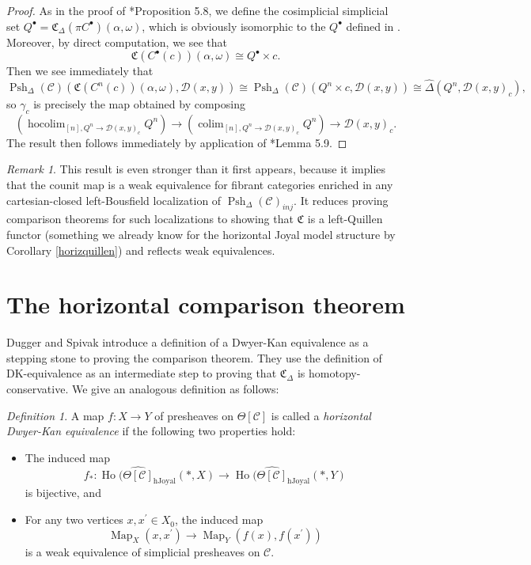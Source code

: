 \documentclass{amsart}
\numberwithin{equation}{section}
\theoremstyle{plain}   %
\theoremstyle{remark}
\newtheorem{rem}[subsection]{Remark}
\newtheorem{defn}[subsection]{Definition}
\theoremstyle{plain}
\DeclareMathOperator*{\coliml}{colim}
\DeclareMathOperator{\Map}{Map}
\DeclareMathOperator*{\hocoliml}{hocolim}
\newcommand{\psh}[1]{\ensuremath{\widehat{#1}}}
\newcommand{\C}{\ensuremath{\mathcal{C}}}
\newcommand{\cellset}{\ensuremath{\widehat{\Theta[\mathcal{C}]}}}
\newcommand{\spsh}{\ensuremath{\operatorname{Psh}_\Delta(\mathcal{C})}}
\begin{document}
\begin{proof}
	As in the proof of \cite{ds2}*{Proposition 5.8}, we define the cosimplicial simplicial set \(Q^\bullet = \mathfrak{C}_\Delta (\pi C^\bullet)(\alpha,\omega)\), which is obviously isomorphic to the \(Q^\bullet\) defined in \cite{ds2}. Moreover, by direct computation, we see that
	\[\mathfrak{C}(C^\bullet(c))(\alpha,\omega)\cong Q^\bullet \times c.\]
	Then we see immediately that
	\[\spsh(\mathfrak{C}(C^n(c))(\alpha,\omega), \mathcal{D}(x,y)) \cong \spsh(Q^n \times c, \mathcal{D}(x,y))\cong \psh{\Delta}(Q^n, \mathcal{D}(x,y)_c),\]
	so \(\gamma_c\) is precisely the map obtained by composing
	\[\left(\hocoliml_{[n],Q^n\to \mathcal{D}(x,y)_c} Q^n\right) \to \left(\coliml_{[n],Q^n\to \mathcal{D}(x,y)_c} Q^n\right) \to \mathcal{D}(x,y)_c.\]
	The result then follows immediately by application of \cite{ds2}*{Lemma 5.9}.
\end{proof}

\begin{rem}
	This result is even stronger than it first appears, because it implies that the counit map is a weak equivalence for fibrant categories enriched in any cartesian-closed left-Bousfield localization of \(\spsh_{inj}\).  It reduces proving comparison theorems for such localizations to showing that \(\mathfrak{C}\) is a left-Quillen functor (something we already know for the horizontal Joyal model structure by Corollary \ref{horizquillen}) and reflects weak equivalences.
\end{rem}

\section{The horizontal comparison theorem}\label{horizcomparison}
Dugger and Spivak introduce a definition of a Dwyer-Kan equivalence as a stepping stone to proving the comparison theorem.  They use the definition of DK-equivalence as an intermediate step to proving that \(\mathfrak{C}_\Delta\) is homotopy-conservative.  We give an analogous definition as follows:

\begin{defn}
  A map \(f:X\to Y\) of presheaves on \(\Theta[\C]\) is called a \emph{horizontal Dwyer-Kan equivalence} if the following two properties hold:
	\begin{itemize}
		\item The induced map
		      \[f_*:\operatorname{Ho}(\cellset_{\mathrm{hJoyal}}(\ast,X) \to \operatorname{Ho}(\cellset_{\mathrm{hJoyal}}(\ast,Y)\]
		      is bijective, and
		\item For any two vertices \(x,x^\prime\in X_0\), the induced map
		      \[\Map_X(x,x^\prime) \to \Map_Y(f(x),f(x^\prime))\]
		      is a weak equivalence of simplicial presheaves on \(\C\).
	\end{itemize}
\end{defn}
\end{document}
